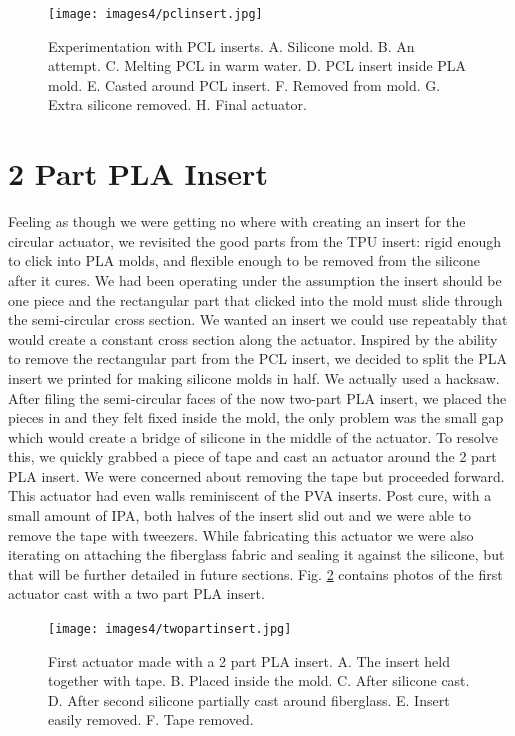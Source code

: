 \begin{figure}[h]
    \centering
    \texttt{[image: images4/pclinsert.jpg]}
    \caption{Experimentation with PCL inserts. A. Silicone mold. B. An attempt. C. Melting PCL in warm water. D. PCL insert inside PLA mold. E. Casted around PCL insert. F. Removed from mold. G. Extra silicone removed. H. Final actuator.}
    \label{fig:pclinsert}
\end{figure}

\section{2 Part PLA Insert}
Feeling as though we were getting no where with creating an insert for the circular actuator, we revisited the good parts from the TPU insert: rigid enough to click into PLA molds, and flexible enough to be removed from the silicone after it cures. We had been operating under the assumption the insert should be one piece and the rectangular part that clicked into the mold must slide through the semi-circular cross section. We wanted an insert we could use repeatably that would create a constant cross section along the actuator. Inspired by the ability to remove the rectangular part from the PCL insert, we decided to split the PLA insert we printed for making silicone molds in half. We actually used a hacksaw. After filing the semi-circular faces of the now two-part PLA insert, we placed the pieces in and they felt fixed inside the mold, the only problem was the small gap which would create a bridge of silicone in the middle of the actuator. To resolve this, we quickly grabbed a piece of tape and cast an actuator around the 2 part PLA insert. We were concerned about removing the tape but proceeded forward. This actuator had even walls reminiscent of the PVA inserts. Post cure, with a small amount of IPA, both halves of the insert slid out and we were able to remove the tape with tweezers. While fabricating this actuator we were also iterating on attaching the fiberglass fabric and sealing it against the silicone, but that will be further detailed in future sections. Fig. \ref{fig:twopartinsert} contains photos of the first actuator cast with a two part PLA insert. 

\begin{figure}[h]
    \centering
    \texttt{[image: images4/twopartinsert.jpg]}
    \caption{First actuator made with a 2 part PLA insert. A. The insert held together with tape. B. Placed inside the mold. C. After silicone cast. D. After second silicone partially cast around fiberglass. E. Insert easily removed. F. Tape removed.}
    \label{fig:twopartinsert}
\end{figure}

